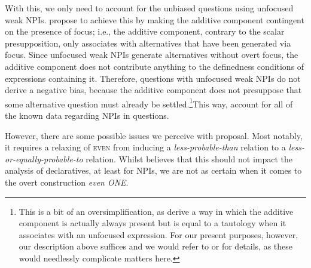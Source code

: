 With this, we only need to account for the unbiased questions using unfocused weak NPIs. \textcite{Jeong2021,Jeong2022} propose to achieve this by making the additive component contingent on the presence of focus; i.e., the additive component, contrary to the scalar presupposition, only associates with alternatives that have been generated via focus. Since unfocused weak NPIs generate alternatives without overt focus, the additive component does not contribute anything to the definedness conditions of expressions containing it. Therefore, questions with unfocused weak NPIs do not derive a negative bias, because the additive component does not presuppose that some alternative question must already be settled.\footnote{This is a bit of an oversimplification, as \textcite{Jeong2021,Jeong2022} derive a way in which the additive component is actually always present but is equal to a tautology when it associates with an unfocused expression. For our present purposes, however, our description above suffices and we would refer to \textcite[p.~12ff]{Jeong2021} or \textcite[p.~27ff]{Jeong2022} for details, as these would needlessly complicate matters here.}This way, \textcite{Jeong2021,Jeong2022} account for all of the known data regarding NPIs in questions. 

However, there are some possible issues we perceive with  proposal. Most notably, it requires a relaxing of {\scshape even} from inducing a \textit{less-probable-than} relation to a \textit{less-or-equally-probable-to} relation. Whilst \textcite[p.~8,~Footnote~6]{Jeong2021} believes that this should not impact the analysis of declaratives, at least for NPIs, we are not as certain when it comes to the overt construction \textit{even ONE}. %

